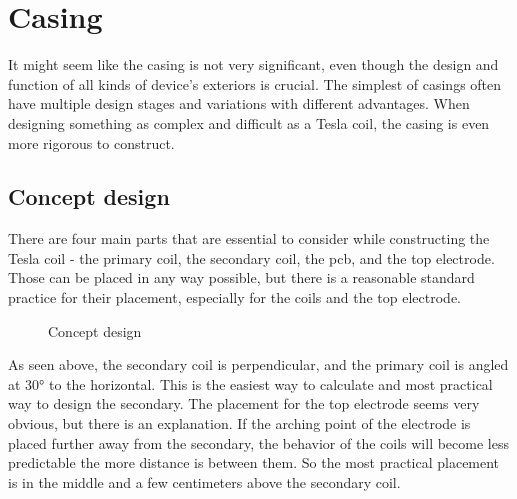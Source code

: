 \chapter{Casing}


It might seem like the casing is not very significant, even though the design and function of all kinds of device's exteriors is crucial. The simplest of casings often have multiple design stages and variations with different advantages. When designing something as complex and difficult as a Tesla coil, the casing is even more rigorous to construct. 


\section{Concept design}
\label{sec:concept-design}

There are four main parts that are essential to consider while constructing the Tesla coil - the primary coil, the secondary coil, the \gls{pcb}, and the top electrode. Those can be placed in any way possible, but there is a reasonable standard practice for their placement, especially for the coils and the top electrode. 

\begin{figure}
    \centering
    \caption{Concept design}
    \label{fig:envision}
\end{figure}

As seen above, the secondary coil is perpendicular, and the primary coil is angled at 30° to the horizontal. This is the easiest way to calculate and most practical way to design the secondary. The placement for the top electrode seems very obvious, but there is an explanation. If the arching point of the electrode is placed further away from the secondary, the behavior of the coils will become less predictable the more distance is between them. So the most practical placement is in the middle and a few centimeters above the secondary coil.

